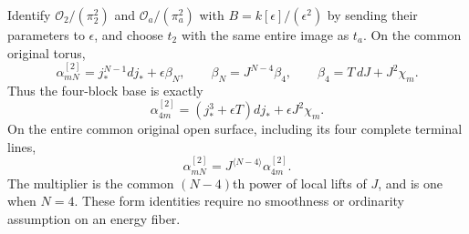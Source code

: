 \begin{theorem}
\label{two:factorisation}
Identify $\mathcal O_2/(\pi_2^2)$ and $\mathcal O_a/(\pi_a^2)$
with $B=k[\epsilon]/(\epsilon^2)$ by sending their parameters to
$\epsilon$, and choose $t_2$ with the same entire image as $t_a$.
On the common original torus,
\begin{equation}
 \alpha_{mN}^{[2]}=j_*^{N-1}dj_*+\epsilon\beta_N,
 \qquad \beta_N=J^{N-4}\beta_4,
 \qquad \beta_4=T\,dJ+J^2\chi_m.
 \label{two:torus-formula}
\end{equation}
Thus the four-block base is exactly
\begin{equation}
 \alpha_{4m}^{[2]}
 =(j_*^3+\epsilon T)dj_*+\epsilon J^2\chi_m.
 \label{two:base}
\end{equation}
On the entire common original open surface, including its four
complete terminal lines,
\begin{equation}
 \alpha_{mN}^{[2]}
 =J^{\langle N-4\rangle}\alpha_{4m}^{[2]}.
 \label{two:global-factorisation}
\end{equation}
The multiplier is the common $(N-4)$th power of local lifts of
$J$, and is one when $N=4$. These form identities require no
smoothness or ordinarity assumption on an energy fiber.
\end{theorem}

